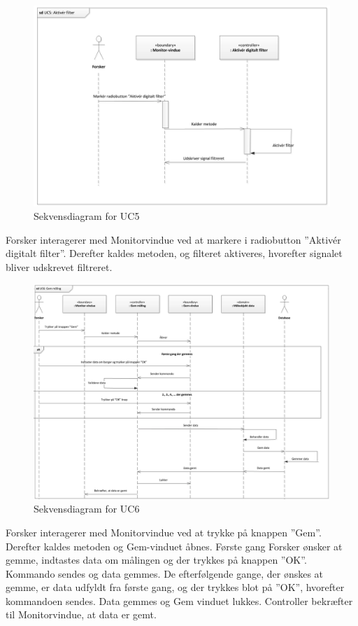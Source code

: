 \begin{figure}[H]
	\centering
	\includegraphics[width=1\textwidth]{Figurer/Snip20151104_35}
	\caption{Sekvensdiagram for UC5}
\end{figure}

Forsker interagerer med Monitorvindue ved at markere i radiobutton ”Aktivér digitalt filter”. Derefter kaldes metoden, og filteret aktiveres, hvorefter signalet bliver udskrevet filtreret.

\begin{figure}[H]
	\centering
	\includegraphics[width=1\textwidth]{Figurer/Snip20151104_36}
	\caption{Sekvensdiagram for UC6}
\end{figure}

Forsker interagerer med Monitorvindue ved at trykke på knappen ”Gem”. Derefter kaldes metoden og Gem-vinduet åbnes. Første gang Forsker ønsker at gemme, indtastes data om målingen og der trykkes på knappen ”OK”. Kommando sendes og data gemmes. De efterfølgende gange, der ønskes at gemme, er data udfyldt fra første gang, og der trykkes blot på ”OK”, hvorefter kommandoen sendes. Data gemmes og Gem vinduet lukkes. Controller bekræfter til Monitorvindue, at data er gemt.

